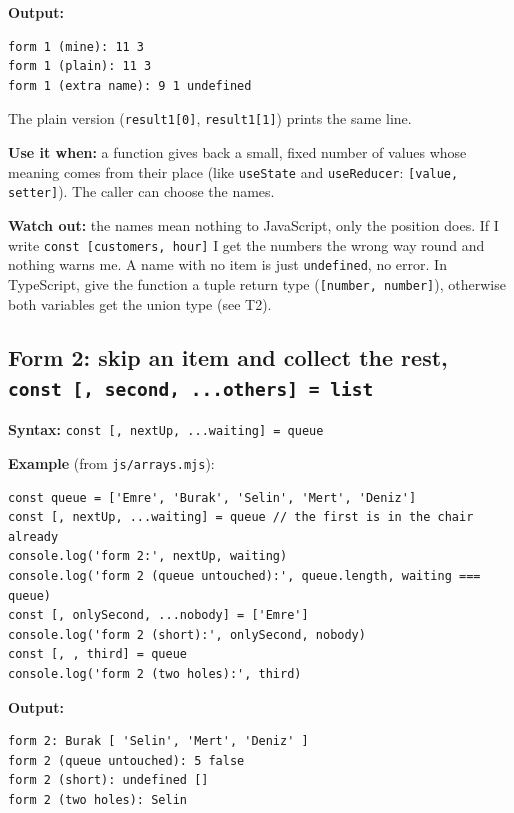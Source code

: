 \textbf{Output:}

\begin{lstlisting}
form 1 (mine): 11 3
form 1 (plain): 11 3
form 1 (extra name): 9 1 undefined
\end{lstlisting}

The plain version (\passthrough{\lstinline!result1[0]!}, \passthrough{\lstinline!result1[1]!}) prints the same line.

\textbf{Use it when:} a function gives back a small, fixed number of values whose meaning comes from their place
(like \passthrough{\lstinline!useState!} and \passthrough{\lstinline!useReducer!}: \passthrough{\lstinline![value, setter]!}). The caller can choose the names.

\textbf{Watch out:} the names mean nothing to JavaScript, only the position does. If I write
\passthrough{\lstinline!const [customers, hour]!} I get the numbers the wrong way round and nothing warns me.
A name with no item is just \passthrough{\lstinline!undefined!}, no error. In TypeScript, give the function a tuple
return type (\passthrough{\lstinline![number, number]!}), otherwise both variables get the union type (see T2).

\subsection{\texorpdfstring{Form 2: skip an item and collect the rest, \texttt{const\ {[},\ second,\ ...others{]}\ =\ list}}{Form 2: skip an item and collect the rest, const {[}, second, ...others{]} = list}}\label{form-2-skip-an-item-and-collect-the-rest-const-second-...others-list}

\textbf{Syntax:} \passthrough{\lstinline!const [, nextUp, ...waiting] = queue!}

\textbf{Example} (from \passthrough{\lstinline!js/arrays.mjs!}):

\begin{lstlisting}
const queue = ['Emre', 'Burak', 'Selin', 'Mert', 'Deniz']
const [, nextUp, ...waiting] = queue // the first is in the chair already
console.log('form 2:', nextUp, waiting)
console.log('form 2 (queue untouched):', queue.length, waiting === queue)
const [, onlySecond, ...nobody] = ['Emre']
console.log('form 2 (short):', onlySecond, nobody)
const [, , third] = queue
console.log('form 2 (two holes):', third)
\end{lstlisting}

\textbf{Output:}

\begin{lstlisting}
form 2: Burak [ 'Selin', 'Mert', 'Deniz' ]
form 2 (queue untouched): 5 false
form 2 (short): undefined []
form 2 (two holes): Selin
\end{lstlisting}

